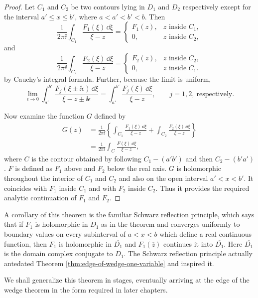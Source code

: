 \begin{proof}
Let $C_1$ and $C_2$ be two contours lying in $D_1$ and $D_2$ respectively
except for the interval $a'\leq x\leq b'$, where $a<a'<b'<b$. Then
\[
  \frac{1}{2\pi\ii}\int_{C_1}
  \frac{F_1(\xi)\,\dd\xi}{\xi-z}
  =
  \begin{cases}
    F_1(z),&z\text{ inside }C_1,\\[2pt]
    0,&z\text{ inside }C_2,
  \end{cases}
\]
and
\[
  \frac{1}{2\pi\ii}\int_{C_2}
  \frac{F_2(\xi)\,\dd\xi}{\xi-z}
  =
  \begin{cases}
    F_2(z),&z\text{ inside }C_2,\\[2pt]
    0,&z\text{ inside }C_1.
  \end{cases}
\]
by Cauchy's integral formula. Further, because the limit is uniform,
\[
  \lim_{\epsilon\to0}\int_{a'}^{b'}
  \frac{F_j(\xi\mathbin{\pm}\ii\epsilon)\,\dd\xi}
       {\xi-z\mathbin{\pm}\ii\epsilon}
  =\int_{a'}^{b'}\frac{F_j(\xi)\,\dd\xi}{\xi-z},
  \qquad j=1,2,\ \text{respectively}.
\]

Now examine the function $G$ defined by
\[
  \begin{aligned}
  G(z)
  &=\frac{1}{2\pi\ii}
    \left\{
      \int_{C_1}\frac{F_1(\xi)\,\dd\xi}{\xi-z}
      +\int_{C_2}\frac{F_2(\xi)\,\dd\xi}{\xi-z}
    \right\} \\
  &=\frac{1}{2\pi\ii}\int_C
    \frac{F(\xi)\,\dd\xi}{\xi-z},
  \end{aligned}
\]
where $C$ is the contour obtained by following $C_1-(a'b')$ and then
$C_2-(b'a')$. $F$ is defined as $F_1$ above and $F_2$ below the real axis.
$G$ is holomorphic throughout the interior of $C_1$ and $C_2$ and also on
the open interval $a'<x<b'$. It coincides with $F_1$ inside $C_1$ and with
$F_2$ inside $C_2$. Thus it provides the required analytic continuation of
$F_1$ and $F_2$.
\end{proof}

A corollary of this theorem is the familiar Schwarz reflection principle,
which says that if $F_1$ is holomorphic in $D_1$ as in the theorem and
converges uniformly to boundary values on every subinterval of $a<x<b$ which
define a real continuous function, then $F_1$ is holomorphic in $\overline{D_1}$
and $\overline{F_1(\overline z)}$ continues it into $\overline{D_1}$. Here
$\overline{D_1}$ is the domain complex conjugate to $D_1$. The Schwarz
reflection principle actually antedated Theorem \ref{thm:edge-of-wedge-one-variable} and inspired it.

We shall generalize this theorem in stages, eventually arriving at the edge
of the wedge theorem in the form required in later chapters.

